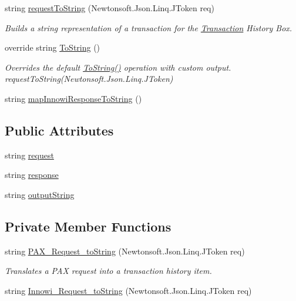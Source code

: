 \begin{DoxyCompactItemize}
string \mbox{\hyperlink{class_cert_complete_1_1_transaction_abda5b8ce085a80ebfe344248df2d7daf}{request\+To\+String}} (Newtonsoft.\+Json.\+Linq.\+J\+Token req)
\begin{DoxyCompactList}\small\item\em Builds a string representation of a transaction for the \mbox{\hyperlink{class_cert_complete_1_1_transaction}{Transaction}} History Box. \end{DoxyCompactList}\item 
override string \mbox{\hyperlink{class_cert_complete_1_1_transaction_a5535efa45706c133127a346d8c33543a}{To\+String}} ()
\begin{DoxyCompactList}\small\item\em Overrides the default \mbox{\hyperlink{class_cert_complete_1_1_transaction_a5535efa45706c133127a346d8c33543a}{To\+String()}} operation with custom output. request\+To\+String(\+Newtonsoft.\+Json.\+Linq.\+J\+Token) \end{DoxyCompactList}\item 
string \mbox{\hyperlink{class_cert_complete_1_1_transaction_a2db04cc750f0ec20bd8be5071deb16fe}{map\+Innowi\+Response\+To\+String}} ()
\end{DoxyCompactItemize}
\subsection*{Public Attributes}
\begin{DoxyCompactItemize}
\item 
string \mbox{\hyperlink{class_cert_complete_1_1_transaction_ac85e595374528d6dd86fc8826609a20e}{request}}
\item 
string \mbox{\hyperlink{class_cert_complete_1_1_transaction_aa514d482b586e66c3cb7d557563efc73}{response}}
\item 
string \mbox{\hyperlink{class_cert_complete_1_1_transaction_a75d502cc315af50677734ff7e2bfa640}{output\+String}}
\end{DoxyCompactItemize}
\subsection*{Private Member Functions}
\begin{DoxyCompactItemize}
\item 
string \mbox{\hyperlink{class_cert_complete_1_1_transaction_a2c329cf1cedbc043c8b419774fab7a7a}{P\+A\+X\+\_\+\+Request\+\_\+to\+String}} (Newtonsoft.\+Json.\+Linq.\+J\+Token req)
\begin{DoxyCompactList}\small\item\em Translates a P\+AX request into a transaction history item. \end{DoxyCompactList}\item 
string \mbox{\hyperlink{class_cert_complete_1_1_transaction_a761f3d08f20e2574b72c9ba7e88ebedb}{Innowi\+\_\+\+Request\+\_\+to\+String}} (Newtonsoft.\+Json.\+Linq.\+J\+Token req)
\end{DoxyCompactItemize}
